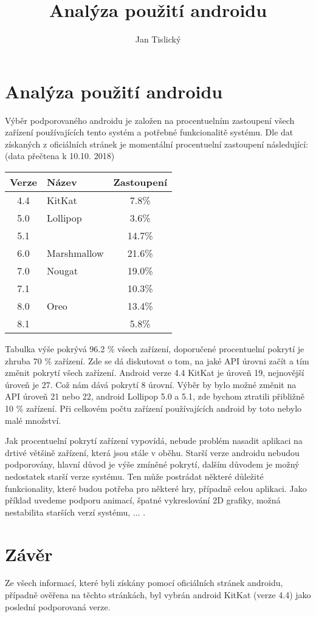 \documentclass{article}
\title{Analýza použití androidu}
\author{Jan Tislický}
\begin{document}
\maketitle
{}

\section{Analýza použití androidu}

Výběr podporovaného androidu je založen na procentuelním zastoupení všech zařízení používajících tento systém a potřebné funkcionalitě systému. Dle dat získaných z oficiálních stránek \citep{distributionDashboard} je momentální procentuelní zastoupení následující: (data přečtena k 10.10. 2018)

\begin{center}
    \begin{tabular}{ | c | l | c|}
        \hline
        \textbf{Verze} & \textbf{Název} & \textbf{Zastoupení}\\ \hline
        4.4 & KitKat & 7.8\% \\ \hline
        5.0 & Lollipop & 3.6\% \\ \hline
        5.1 &  & 14.7\% \\ \hline
        6.0 & Marshmallow & 21.6\% \\ \hline
        7.0 & Nougat & 19.0\% \\ \hline
        7.1 &  & 10.3\% \\ \hline
        8.0 & Oreo & 13.4\% \\ \hline
        8.1 &  & 5.8\% \\ \hline
    \end{tabular}
\end{center}

Tabulka výše pokrývá 96.2 \% všech zařízení, doporučené procentuelní pokrytí je zhruba 70 \% zařízení. Zde se dá diskutovat o tom, na jaké API úrovni začít a tím změnit pokrytí všech zařízení. Android verze 4.4 KitKat je úroveň 19, nejnovější úroveň je 27. Což nám dává pokrytí 8 úrovní. Výběr by bylo možné změnit na API úroveň 21 nebo 22, android Lollipop 5.0 a 5.1, zde bychom ztratili přibližně 10 \% zařízení. Při celkovém počtu zařízení používajících android by toto nebylo malé množství.

Jak procentuelní pokrytí zařízení vypovídá, nebude problém nasadit aplikaci na drtivé většině zařízení, která jsou stále v oběhu. Starší verze androidu nebudou podporovány, hlavní důvod je výše zmíněné pokrytí, dalším důvodem je možný nedostatek starší verze systému. Ten může postrádat některé důležité funkcionality, které budou potřeba pro některé hry, případně celou aplikaci. Jako příklad uvedeme podporu animací, špatné vykreslování 2D grafiky, možná nestabilita starších verzí systému, ... \citep{versionCompare}.

\section{Závěr} Ze všech informací, které byli získány pomocí oficiálních stránek androidu, případně ověřena na těchto stránkách, byl vybrán android KitKat (verze 4.4) jako poslední podporovaná verze. 



\end{document}

